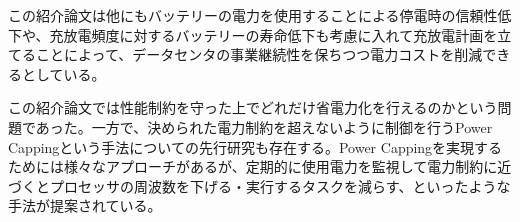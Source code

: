 この紹介論文は他にもバッテリーの電力を使用することによる停電時の信頼性低下や、充放電頻度に対するバッテリーの寿命低下も考慮に入れて充放電計画を立てることによって、データセンタの事業継続性を保ちつつ電力コストを削減できるとしている。

この紹介論文では性能制約を守った上でどれだけ省電力化を行えるのかという問題であった。一方で、決められた電力制約を超えないように制御を行うPower Cappingという手法についての先行研究も存在する\cite{Fan:2007:PPW:1273440.1250665}。Power Cappingを実現するためには様々なアプローチがあるが、定期的に使用電力を監視して電力制約に近づくとプロセッサの周波数を下げる・実行するタスクを減らす、といったような手法が提案されている。




